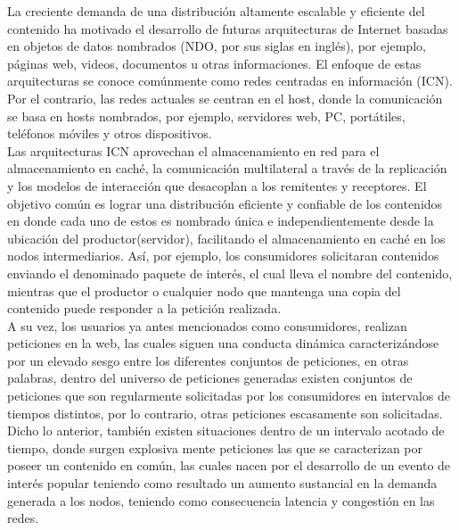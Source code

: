 \documentclass[12pt]{ociamthesis}  %
\begin{document}
La creciente demanda de una distribución altamente escalable y eficiente del contenido ha motivado el desarrollo de futuras arquitecturas de Internet basadas en objetos de datos nombrados (NDO, por sus siglas en inglés), por ejemplo, páginas web, videos, documentos u otras informaciones. El enfoque de estas arquitecturas se conoce comúnmente como redes centradas en información (ICN). Por el contrario, las redes actuales se centran en el host, donde la comunicación se basa en hosts nombrados, por ejemplo, servidores web, PC, portátiles, teléfonos móviles y otros dispositivos\cite{ahlgren2012survey}.\\

Las arquitecturas ICN aprovechan el almacenamiento en red para el almacenamiento en caché, la comunicación multilateral a través de la replicación y los modelos de interacción que desacoplan a los remitentes y receptores. El objetivo común es lograr una distribución eficiente y confiable de los contenidos en donde cada uno de estos es nombrado única e independientemente desde la ubicación del productor(servidor), facilitando el almacenamiento en caché en los nodos intermediarios. Así, por ejemplo, los consumidores solicitaran contenidos enviando el denominado paquete de interés, el cual lleva el nombre del contenido, mientras que el productor o cualquier nodo que mantenga una copia del contenido puede responder a la petición realizada.\cite{ahlgren2012survey}\\

A su vez, los usuarios ya antes mencionados como consumidores, realizan peticiones en la web, las cuales siguen una conducta dinámica caracterizándose por un elevado sesgo entre los diferentes conjuntos de peticiones, en otras palabras, dentro del universo de peticiones generadas existen conjuntos de peticiones que son regularmente solicitadas por los consumidores en intervalos de tiempos distintos, por lo contrario, otras peticiones escasamente son solicitadas. Dicho lo anterior, también existen situaciones dentro de un intervalo acotado de tiempo, donde surgen explosiva mente peticiones las que se caracterizan por poseer un contenido en común, las cuales nacen por el desarrollo de un evento de interés popular teniendo como resultado un aumento sustancial en la demanda generada a los nodos, teniendo como consecuencia latencia y congestión en las redes.
\end{document}
